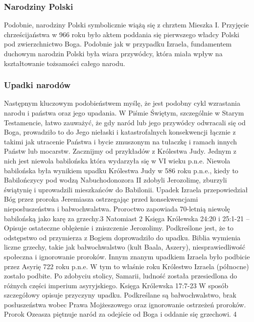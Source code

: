 \subsubsection{Narodziny Polski}

Podobnie, narodziny Polski symbolicznie wiążą się z chrztem Mieszka I. Przyjęcie
chrześcijaństwa w 966 roku było aktem poddania się pierwszego władcy Polski pod
zwierzchnictwo Boga. Podobnie jak w przypadku Izraela, fundamentem duchowym 
narodzin Polski była wiara przywódcy, która miała wpływ na kształtowanie tożsamości
całego narodu.

\subsubsection{Upadki narodów}

Następnym kluczowym podobieństwem myślę, że jest podobny cykl wzrastania
narodu i państwa oraz jego upadania. W Piśmie Świętym, szczególnie w Starym
Testamencie, łatwo zauważyć, że gdy naród lub jego przywódcy odwracali się od Boga,
prowadziło to do Jego niełaski i katastrofalnych konsekwencji łącznie z takimi jak utracenie
Państwa i bycie zmuszonym na tułaczkę i ramach innych Państw lub mocarstw.
Zacznijmy od przykładów z Królestwa Judy. Jednym z nich jest niewola babilońska
która wydarzyła się w VI wieku p.n.e. Niewola babilońska była wynikiem upadku Królestwa
Judy w 586 roku p.n.e., kiedy to Babilończycy pod wodzą Nabuchodonozora II zdobyli
Jerozolimę, zburzyli świątynię i uprowadzili mieszkańców do Babilonii. Upadek Izraela
przepowiedział Bóg przez proroka Jeremiasza ostrzegając przed konsekwencjami
nieposłuszeństwa i bałwochwalstwa. Proroctwo zapowiada 70-letnią niewolę babilońską
jako karę za grzechy.3 Natomiast 2 Księga Królewska 24:20 i 25:1-21 – Opisuje ostateczne
oblężenie i zniszczenie Jerozolimy. Podkreślone jest, że to odstępstwo od przymierza z
Bogiem doprowadziło do upadku. Biblia wymienia liczne grzechy, takie jak
bałwochwalstwo (kult Baala, Aszery), niesprawiedliwość społeczna i ignorowanie
proroków.
Innym znanym upadkiem Izraela było podbicie przez Asyrię 722 roku p.n.e. W tym to
właśnie roku Królestwo Izraela (północne) zostało podbite. Po zdobyciu stolicy, Samarii,
ludność została przesiedlona do różnych części imperium asyryjskiego. Księga Królewska
17:7-23 W sposób szczegółowy opisuje przyczyny upadku. Podkreślane są
bałwochwalstwo, brak posłuszeństwa wobec Prawa Mojżeszowego oraz ignorowanie
ostrzeżeń proroków. Prorok Ozeasza piętnuje naród za odejście od Boga i oddanie się
grzechowi. 4

